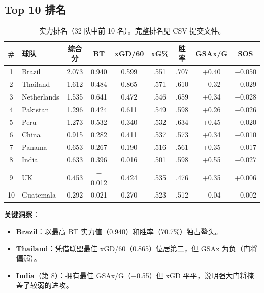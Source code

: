 \documentclass[11pt, a4paper]{article}
\begin{document}
\subsection{Top 10 排名}

\begin{table}[H]
\centering
\caption{实力排名（32 队中前 10 名）。完整排名见 CSV 提交文件。}
\label{tab:rankings}
\begin{tabular}{clccccccc}
\toprule
\textbf{\#} & \textbf{球队} & \textbf{综合分} & \textbf{BT} & \textbf{xGD/60} & \textbf{xG\%} & \textbf{胜率} & \textbf{GSAx/G} & \textbf{SOS} \\
\midrule
1  & Brazil      & 2.073 & 0.940 & 0.599 & .551 & .707 & +0.40 & $-$0.050 \\
2  & Thailand    & 1.612 & 0.484 & 0.865 & .571 & .610 & $-$0.32 & $-$0.029 \\
3  & Netherlands & 1.535 & 0.641 & 0.472 & .546 & .659 & +0.34 & $-$0.028 \\
4  & Pakistan    & 1.296 & 0.424 & 0.611 & .549 & .598 & +0.26 & $-$0.026 \\
5  & Peru        & 1.273 & 0.532 & 0.340 & .532 & .634 & +0.45 & $-$0.020 \\
6  & China       & 0.915 & 0.282 & 0.411 & .537 & .573 & +0.34 & $-$0.010 \\
7  & Panama      & 0.653 & 0.267 & 0.190 & .516 & .561 & +0.35 & $-$0.017 \\
8  & India       & 0.633 & 0.396 & 0.016 & .501 & .598 & +0.55 & $-$0.027 \\
9  & UK          & 0.453 & $-$0.012 & 0.424 & .535 & .476 & +0.35 & +0.006 \\
10 & Guatemala   & 0.292 & 0.021 & 0.270 & .523 & .512 & $-$0.04 & $-$0.002 \\
\bottomrule
\end{tabular}
\end{table}

\noindent \textbf{关键洞察}：
\begin{itemize}[nosep]
    \item \textbf{Brazil}：以最高 BT 实力值（0.940）和胜率（70.7\%）独占鳌头。
    \item \textbf{Thailand}：凭借联盟最佳 xGD/60（0.865）位居第二，但 GSAx 为负（门将偏弱）。
    \item \textbf{India}（第 8）：拥有最佳 GSAx/G（+0.55）但 xGD 平平，说明强大门将掩盖了较弱的进攻。
\end{itemize}

\end{document}
